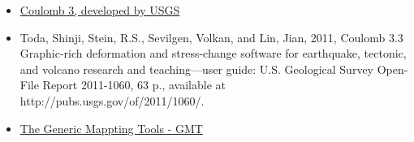 \begin{itemize}
\item
  \href{https://earthquake.usgs.gov/research/software/coulomb/}{Coulomb
  3, developed by USGS}
\item
  Toda, Shinji, Stein, R.S., Sevilgen, Volkan, and Lin, Jian, 2011,
  Coulomb 3.3 Graphic-rich deformation and stress-change software for
  earthquake, tectonic, and volcano research and teaching---user guide:
  U.S. Geological Survey Open-File Report 2011-1060, 63 p., available at
  http://pubs.usgs.gov/of/2011/1060/.
\item
  \href{http://gmt.soest.hawaii.edu/}{The Generic Mappting Tools - GMT}
\end{itemize}
